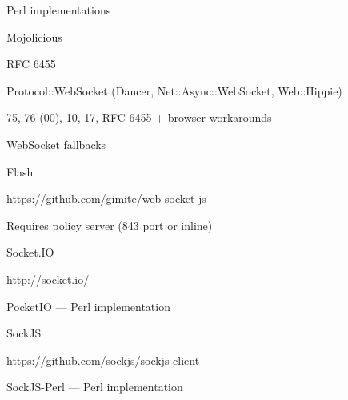 \documentclass[14pt]{beamer}
\begin{document}
\begin{frame}
    \begin{center}
    Perl implementations
    \end{center}
\end{frame}

\begin{frame}
    \begin{center}
    Mojolicious

    RFC 6455
    \end{center}
\end{frame}

\begin{frame}
    \begin{center}
    Protocol::WebSocket (Dancer, Net::Async::WebSocket, Web::Hippie)

    75, 76 (00), 10, 17, RFC 6455 + browser workarounds
    \end{center}
\end{frame}

\begin{frame}
    \begin{center}
    WebSocket fallbacks
    \end{center}
\end{frame}

\begin{frame}
    \begin{center}
    Flash

    https://github.com/gimite/web-socket-js

    Requires policy server (843 port or inline)
    \end{center}
\end{frame}

\begin{frame}
    \begin{center}
    Socket.IO

    http://socket.io/

    PocketIO --- Perl implementation
    \end{center}
\end{frame}

\begin{frame}
    \begin{center}
    SockJS

    https://github.com/sockjs/sockjs-client

    SockJS-Perl --- Perl implementation
    \end{center}
\end{frame}
\end{document}
